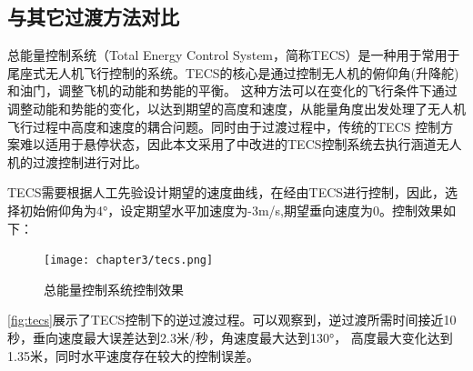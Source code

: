 \subsection{与其它过渡方法对比}
总能量控制系统（Total Energy Control System，简称TECS）是一种用于常用于尾座式无人机飞行控制的系统。TECS的核心是通过控制无人机的俯仰角(升降舵)和油门，调整飞机的动能和势能的平衡。
这种方法可以在变化的飞行条件下通过调整动能和势能的变化，以达到期望的高度和速度，从能量角度出发处理了无人机飞行过程中高度和速度的耦合问题。同时由于过渡过程中，传统的TECS
控制方案难以适用于悬停状态，因此本文采用了\cite{argyle2016modeling}中改进的TECS控制系统去执行涵道无人机的过渡控制进行对比。

TECS需要根据人工先验设计期望的速度曲线，在经由TECS进行控制，因此，选择初始俯仰角为4°，设定期望水平加速度为-3m/s,期望垂向速度为0。控制效果如下：
\begin{figure}[htbp]
    \centering
    \texttt{[image: chapter3/tecs.png]}
    \caption{\label{fig:tecs}总能量控制系统控制效果}
    \label{fig:tecs}
\end{figure}
\autoref{fig:tecs}展示了TECS控制下的逆过渡过程。可以观察到，逆过渡所需时间接近10秒，垂向速度最大误差达到2.3米/秒，角速度最大达到130°，
高度最大变化达到1.35米，同时水平速度存在较大的控制误差。

